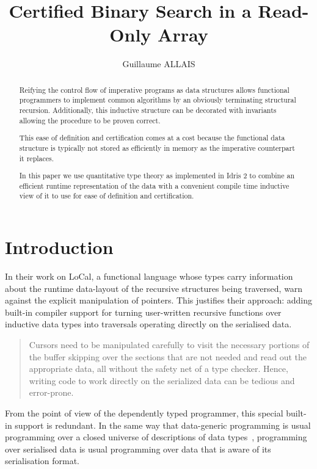 \documentclass{article}
\title{Certified Binary Search in a Read-Only Array}
\author{Guillaume ALLAIS}
\begin{document}
\maketitle

\begin{abstract}
  Reifying the control flow of imperative programs as data structures allows
  functional programmers to implement common algorithms by an obviously
  terminating structural recursion. Additionally, this inductive structure
  can be decorated with invariants allowing the procedure to be proven correct.

  This ease of definition and certification comes at a cost because the
  functional data structure is typically not stored as efficiently in
  memory as the imperative counterpart it replaces.

  In this paper we use quantitative type theory as implemented in Idris 2 to
  combine an efficient runtime representation of the data with a convenient
  compile time inductive view of it to use for ease of definition and
  certification.
\end{abstract}

\section{Introduction}

In their work on LoCal, a functional language whose types carry information
about the runtime data-layout of the recursive structures being traversed,
\citet{DBLP:conf/pldi/VollmerKRS0N19} warn against the explicit manipulation
of pointers.
%
This justifies their approach: adding built-in compiler support for turning
user-written recursive functions over inductive data types into traversals
operating directly on the serialised data.

\begin{quote}
  Cursors need to be manipulated carefully to visit the necessary portions
  of the buffer skipping over the sections that are not needed and read out
  the appropriate data, all without the safety net of a type checker. Hence,
  writing code to work directly on the serialized data can be tedious and
  error-prone.
\end{quote}

From the point of view of the dependently typed programmer, this special built-in
support is redundant. In the same way that data-generic programming is usual
programming over a closed universe of descriptions of data
types~\citep{DBLP:conf/ifip2-1/AltenkirchM02},
programming over serialised data is usual programming over data that is aware
of its serialisation format.
\end{document}
